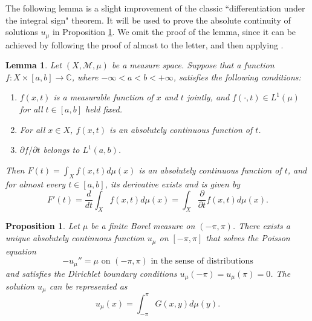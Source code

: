 \documentclass[11pt]{amsart}
\newtheorem{proposition}[theorem]{Proposition}
\newtheorem{lemma}[theorem]{Lemma}
\numberwithin{equation}{section}
\begin{document}
The following lemma is a slight improvement of the classic ``differentiation under the integral sign" theorem. It will be used to prove the absolute continuity of solutions \(u_\mu\) in Proposition \ref{Representation}. We omit the proof of the lemma, since it can be achieved by following the proof of \cite[Theorem 2.27]{Folland} almost to the letter, and then applying \cite[Theorem 3.35]{Folland}.
\begin{lemma}\label{Lemma}
Let \((X,\mathcal{M},\mu)\) be a measure space. Suppose that a function \(f:X\times[a,b]\to\mathbb{C}\), where \(-\infty<a<b<+\infty\), satisfies the following conditions:
\begin{enumerate}
    \item[1.] \(f(x,t)\) is a measurable function of \(x\) and \(t\) jointly, and \(f(\cdot,t)\in L^1(\mu)\) for all \(t\in[a,b]\) held fixed.
    \item[2.] For all \(x\in X\), \(f(x,t)\) is an absolutely continuous function of \(t\).
    \item[3.] \(\partial f/ \partial t\) belongs to \(L^1(a,b)\).
\end{enumerate}
Then \(F(t)=\int_X f(x,t)d\mu(x)\) is an absolutely continuous function of \(t\), and for almost every \(t\in [a,b]\), its derivative exists and is given by
\[F'(t)=\frac{d}{dt}\int_X f(x,t)d\mu(x)=\int_X\frac{\partial}{\partial t}f(x,t)d\mu(x).\]
\end{lemma}
\begin{proposition}\label{Representation}
Let \(\mu\) be a finite Borel measure on \((-\pi,\pi)\). There exists a unique absolutely continuous function \(u_\mu\) on \([-\pi,\pi]\) that solves the Poisson equation
\[-u_\mu''=\mu\text{ on } (-\pi,\pi) \text{ in the sense of distributions}\]
and satisfies the Dirichlet boundary conditions \(u_\mu(-\pi)=u_\mu(\pi)=0\). The solution \(u_\mu\) can be represented as
\begin{equation}\label{u_mu}
u_\mu(x)=\int_{-\pi}^\pi G(x,y)d\mu(y).
\end{equation}
\end{proposition}
\end{document}
